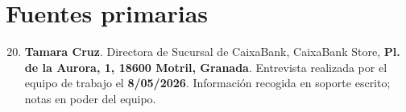 \section*{Fuentes primarias}

\begin{enumerate}
  \setcounter{enumi}{19}

  \item \label{ref:entrevista}
    \textbf{Tamara Cruz}. Directora de Sucursal de CaixaBank, CaixaBank Store,
    \textbf{Pl. de la Aurora, 1, 18600 Motril, Granada}.
    Entrevista realizada por el equipo de trabajo el \textbf{8/05/2026}.
    Información recogida en soporte escrito; notas en poder del equipo.

\end{enumerate}

\endinput
